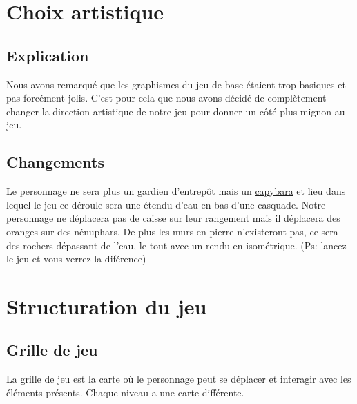 \documentclass[french, 12pt]{article}
\begin{document}
\section{Choix artistique} %


   \subsection{Explication}
       Nous avons remarqué que les graphismes du jeu de base étaient trop basiques et pas forcément jolis. C'est pour cela que nous avons décidé de complètement changer la direction artistique de notre jeu pour donner un côté plus mignon au jeu.


   \subsection{Changements}
       Le personnage ne sera plus un gardien d'entrepôt mais un \href{https://fr.wikipedia.org/wiki/Hydrochoerus_hydrochaeris}{capybara} et lieu dans lequel le jeu ce déroule sera une étendu d'eau en bas d'une casquade. Notre personnage ne déplacera pas de caisse sur leur rangement mais il déplacera des oranges sur des nénuphars.
       De plus les murs en pierre n'existeront pas, ce sera des rochers dépassant de l'eau, le tout avec un rendu en isométrique.
       (Ps: lancez le jeu et vous verrez la diférence)


\section{Structuration du jeu}


   \label{sec:Map}
   \subsection{Grille de jeu}
       La grille de jeu est la carte où le personnage peut se déplacer et interagir avec les éléments présents. Chaque niveau a une carte différente.
\end{document}
